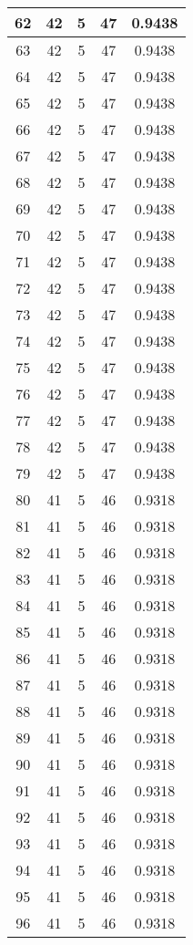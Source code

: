\documentclass[letterpaper, 12pt]{article}
\begin{document}
\begin{longtable}{|c|c|c|c|c|}
\hline
62 & 42 & 5 & 47 & 0.9438 \\
\hline
63 & 42 & 5 & 47 & 0.9438 \\
\hline
64 & 42 & 5 & 47 & 0.9438 \\
\hline
65 & 42 & 5 & 47 & 0.9438 \\
\hline
66 & 42 & 5 & 47 & 0.9438 \\
\hline
67 & 42 & 5 & 47 & 0.9438 \\
\hline
68 & 42 & 5 & 47 & 0.9438 \\
\hline
69 & 42 & 5 & 47 & 0.9438 \\
\hline
70 & 42 & 5 & 47 & 0.9438 \\
\hline
71 & 42 & 5 & 47 & 0.9438 \\
\hline
72 & 42 & 5 & 47 & 0.9438 \\
\hline
73 & 42 & 5 & 47 & 0.9438 \\
\hline
74 & 42 & 5 & 47 & 0.9438 \\
\hline
75 & 42 & 5 & 47 & 0.9438 \\
\hline
76 & 42 & 5 & 47 & 0.9438 \\
\hline
77 & 42 & 5 & 47 & 0.9438 \\
\hline
78 & 42 & 5 & 47 & 0.9438 \\
\hline
79 & 42 & 5 & 47 & 0.9438 \\
\hline
80 & 41 & 5 & 46 & 0.9318 \\
\hline
81 & 41 & 5 & 46 & 0.9318 \\
\hline
82 & 41 & 5 & 46 & 0.9318 \\
\hline
83 & 41 & 5 & 46 & 0.9318 \\
\hline
84 & 41 & 5 & 46 & 0.9318 \\
\hline
85 & 41 & 5 & 46 & 0.9318 \\
\hline
86 & 41 & 5 & 46 & 0.9318 \\
\hline
87 & 41 & 5 & 46 & 0.9318 \\
\hline
88 & 41 & 5 & 46 & 0.9318 \\
\hline
89 & 41 & 5 & 46 & 0.9318 \\
\hline
90 & 41 & 5 & 46 & 0.9318 \\
\hline
91 & 41 & 5 & 46 & 0.9318 \\
\hline
92 & 41 & 5 & 46 & 0.9318 \\
\hline
93 & 41 & 5 & 46 & 0.9318 \\
\hline
94 & 41 & 5 & 46 & 0.9318 \\
\hline
95 & 41 & 5 & 46 & 0.9318 \\
\hline
96 & 41 & 5 & 46 & 0.9318 \\

\end{longtable}
\end{document}
